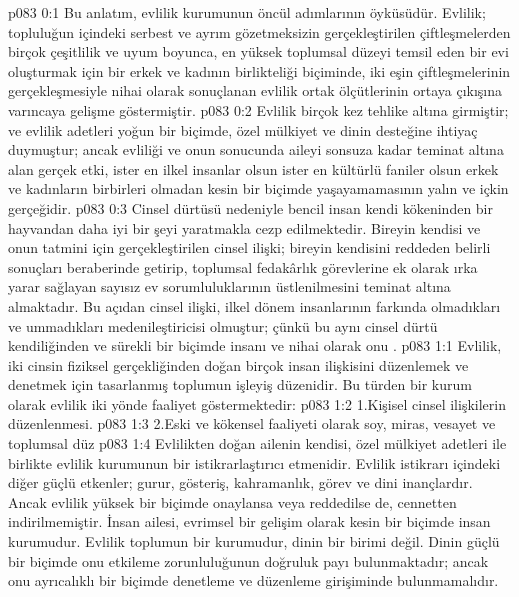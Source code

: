 \vs p083 0:1 Bu anlatım, evlilik kurumunun öncül adımlarının öyküsüdür. Evlilik; topluluğun içindeki serbest ve ayrım gözetmeksizin gerçekleştirilen çiftleşmelerden birçok çeşitlilik ve uyum boyunca, en yüksek toplumsal düzeyi temsil eden bir evi oluşturmak için bir erkek ve kadının birlikteliği biçiminde, iki eşin çiftleşmelerinin gerçekleşmesiyle nihai olarak sonuçlanan evlilik ortak ölçütlerinin ortaya çıkışına varıncaya gelişme göstermiştir.
\vs p083 0:2 Evlilik birçok kez tehlike altına girmiştir; ve evlilik adetleri yoğun bir biçimde, özel mülkiyet ve dinin desteğine ihtiyaç duymuştur; ancak evliliği ve onun sonucunda aileyi sonsuza kadar teminat altına alan gerçek etki, ister en ilkel insanlar olsun ister en kültürlü faniler olsun erkek ve kadınların birbirleri olmadan kesin bir biçimde yaşayamamasının yalın ve içkin gerçeğidir.
\vs p083 0:3 Cinsel dürtüsü nedeniyle bencil insan kendi kökeninden bir hayvandan daha iyi bir şeyi yaratmakla cezp edilmektedir. Bireyin kendisi ve onun tatmini için gerçekleştirilen cinsel ilişki; bireyin kendisini reddeden belirli sonuçları beraberinde getirip, toplumsal fedakârlık görevlerine ek olarak ırka yarar sağlayan sayısız ev sorumluluklarının üstlenilmesini teminat altına almaktadır. Bu açıdan cinsel ilişki, ilkel dönem insanlarının farkında olmadıkları ve ummadıkları medenileştiricisi olmuştur; çünkü bu aynı cinsel dürtü kendiliğinden ve sürekli bir biçimde insanı  ve nihai olarak onu .
\vs p083 1:1 Evlilik, iki cinsin fiziksel gerçekliğinden doğan birçok insan ilişkisini düzenlemek ve denetmek için tasarlanmış toplumun işleyiş düzenidir. Bu türden bir kurum olarak evlilik iki yönde faaliyet göstermektedir:
\vs p083 1:2 1.\bibnobreakspace Kişisel cinsel ilişkilerin düzenlenmesi.
\vs p083 1:3 2.\bibnobreakspace Eski ve kökensel faaliyeti olarak soy, miras, vesayet ve toplumsal düz
\vs p083 1:4 Evlilikten doğan ailenin kendisi, özel mülkiyet adetleri ile birlikte evlilik kurumunun bir istikrarlaştırıcı etmenidir. Evlilik istikrarı içindeki diğer güçlü etkenler; gurur, gösteriş, kahramanlık, görev ve dini inançlardır. Ancak evlilik yüksek bir biçimde onaylansa veya reddedilse de, cennetten indirilmemiştir. İnsan ailesi, evrimsel bir gelişim olarak kesin bir biçimde insan kurumudur. Evlilik toplumun bir kurumudur, dinin bir birimi değil. Dinin güçlü bir biçimde onu etkileme zorunluluğunun doğruluk payı bulunmaktadır; ancak onu ayrıcalıklı bir biçimde denetleme ve düzenleme girişiminde bulunmamalıdır.
